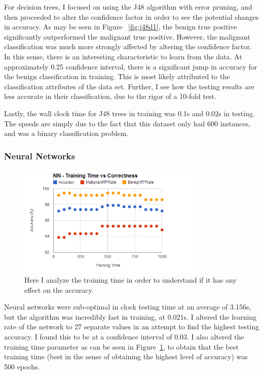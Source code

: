 \documentclass[annual]{acmsiggraph}
\begin{document}
For decision trees, I focused on using the J48 algorithm with error pruning, and then proceeded
to alter the confidence factor in order to see the potential changes in accuracy. As may be seen
in Figure ~\ref{fig:j48d1}, the benign true positive significantly outperformed the malignant true positive.
However, the malignant classification was much more strongly affected by altering the confidence
factor. In this sense, there is an interesting characteristic to learn from the data. At
approximately 0.25 confidence interval, there is a significant jump in accuracy for the benign classification
in training. This is most likely attributed to the classification attributes of the data set. Further, I see
how the testing results are less accurate in their classification, due to the rigor of a 10-fold test.

Lastly, the wall clock time for J48 trees in training was 0.1s and 0.02s in testing. The speeds
are simply due to the fact that this dataset only had 600 instances, and was a binary classification
problem.

\subsubsection{Neural Networks}

\begin{figure}[ht]
  \centering
  \includegraphics[width=3.5in]{charts/chart_2_nn_d1.png}
  \caption{Here I analyze the training time in order to understand if it has any effect on the accuracy.}
  \label{fig:nn3d1}
\end{figure}

Neural networks were sub-optimal in clock testing time at an average of 3.156s, but the algorithm
was incredibly fast in training, at 0.021s. I altered the learning rate of the network to 27 separate
values in an attempt to find the highest testing accuracy. I found this to be at a confidence interval
of 0.03. I also altered the training time parameter as can be seen in Figure~\ref{fig:nn3d1}, to obtain
that the best training time (best in the sense of obtaining the highest level of accuracy) was 500 epochs. 
\end{document}
